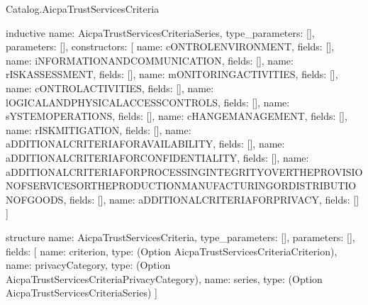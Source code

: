 \begin{lexlean}{Catalog.AicpaTrustServicesCriteria}
\begin{semanticmodule}
inductive{
  name: AicpaTrustServicesCriteriaSeries,
  type_parameters: [],
  parameters: [],
  constructors: [
    {name: cONTROLENVIRONMENT, fields: []},
    {name: iNFORMATIONANDCOMMUNICATION, fields: []},
    {name: rISKASSESSMENT, fields: []},
    {name: mONITORINGACTIVITIES, fields: []},
    {name: cONTROLACTIVITIES, fields: []},
    {name: lOGICALANDPHYSICALACCESSCONTROLS, fields: []},
    {name: sYSTEMOPERATIONS, fields: []},
    {name: cHANGEMANAGEMENT, fields: []},
    {name: rISKMITIGATION, fields: []},
    {name: aDDITIONALCRITERIAFORAVAILABILITY, fields: []},
    {name: aDDITIONALCRITERIAFORCONFIDENTIALITY, fields: []},
    {name: aDDITIONALCRITERIAFORPROCESSINGINTEGRITYOVERTHEPROVISIONOFSERVICESORTHEPRODUCTIONMANUFACTURINGORDISTRIBUTIONOFGOODS, fields: []},
    {name: aDDITIONALCRITERIAFORPRIVACY, fields: []}
  ]
}

structure{
  name: AicpaTrustServicesCriteria,
  type_parameters: [],
  parameters: [],
  fields: [
    {name: criterion, type: (Option AicpaTrustServicesCriteriaCriterion)},
    {name: privacyCategory, type: (Option AicpaTrustServicesCriteriaPrivacyCategory)},
    {name: series, type: (Option AicpaTrustServicesCriteriaSeries)}
  ]
}
\end{semanticmodule}
\end{lexlean}
